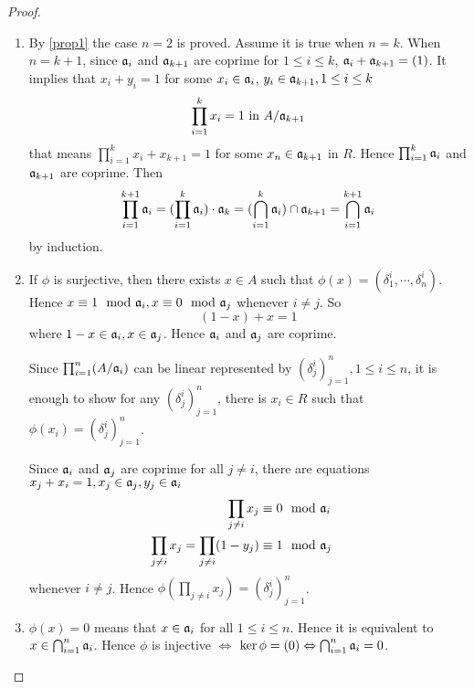 \documentclass{amsart}
\begin{document}
\begin{proof}
	\begin{enumerate}
		\item By \ref{prop1} the case $n=2$ is proved. Assume it is true when $n=k$. When $n= k+1$, since $\mathfrak{a}_i$ and $\mathfrak{a}_{k+1}$ are coprime for $1 \leq i \leq k$, $\mathfrak{a}_i + \mathfrak{a}_{k+1}= (1)$. It implies that $x_i + y_i =1$ for some $x_i \in \mathfrak{a}_i$, $y_i \in \mathfrak{a}_{k+1}, 1 \leq i \leq k$
		\[
			\prod_{i=1}^{k} x_i =1 \text{ in } A/\mathfrak{a}_{k+1}
		\]
		that means $\prod_{i=1}^{k}x_i + x_{k+1}=1$ for some $x_n \in \mathfrak{a}_{k+1}$ in $R$. Hence $\prod_{i=1}^{k} \mathfrak{a}_i$ and $\mathfrak{a}_{k+1}$ are coprime. Then 
		\[
		\prod_{i=1}^{k+1}\mathfrak{a}_i = ( \prod_{i=1}^{k} \mathfrak{a}_i) \cdot \mathfrak{a}_{k}= (\bigcap_{i=1}^{k} \mathfrak{a}_i) \cap \mathfrak{a}_{k+1} = \bigcap_{i=1}^{k+1} \mathfrak{a}_i
		\]
		by induction.
		\item If $\phi$ is surjective, then there exists $x \in A$ such that $\phi(x)= (\delta_{1}^{i}, \cdots, \delta_{n}^{i})$.
		 Hence $x \equiv 1 \mod \ff{a}_i, x \equiv  0 \mod \ff{a}_j$ whenever $i \neq j$. So
		 \[
		 (1-x)+ x = 1
		 \]
		 where $1-x \in \mathfrak{a}_i, x \in \mathfrak{a}_j$. Hence $\mathfrak{a}_i$ and $\mathfrak{a}_j$ are coprime.
		 
		 Since $\prod_{i=1}^{n}(A/\mathfrak{a}_i)$ can be linear represented by $(\delta_j^i)_{j=1}^n, 1 \leq i \leq n$, it is enough to show for any $(\delta_j^i)_{j=1}^n$, there is $x_i \in R$ such that $\phi(x_i)=(\delta_{j}^{i})_{j=1}^n$.
		 
		 Since $\mathfrak{a}_i$ and $\mathfrak{a}_j$ are coprime for all $j \neq i$, there are equations $x_j + x_i =1, x_j \in \mathfrak{a}_j, y_j \in \mathfrak{a}_i$
		 \[
		 \begin{aligned}
		 \prod_{j \neq i} x_j \equiv 0 &\mod \ff{a}_i&\\
		 \prod_{j \neq i} x_j = \prod_{j \neq i}(1- y_j) \equiv 1 &\mod \ff{a}_j
		 \end{aligned}		 
		 \]
		 whenever $i \neq j$. Hence $\phi(\prod_{j \neq i} x_j) = (\delta_{j}^i)_{j=1}^n$.
		\item $\phi(x)=0$ means that $x \in \mathfrak{a}_i$ for all $1 \leq i \leq n$. Hence it is equivalent to $x \in \bigcap_{i=1}^n \mathfrak{a}_i$. Hence $\phi$ is injective $\Leftrightarrow$ $\ker \phi = (0) \Leftrightarrow \bigcap_{i=1}^{n} \mathfrak{a}_i =0$.
	\end{enumerate}
\end{proof}
\end{document}
